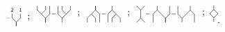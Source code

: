 \documentclass{amsart}
\renewcommand{\1}{\mathbf{1}}
\theoremstyle{definition}
\begin{document}
\begin{equation*}
\begin{tikzpicture}[scale=.15]
\draw node[scale=.8] at (8,2){$\scriptstyle -$};

\draw node[scale=.8] at (9,4){$\scriptstyle 2$};
\draw node[scale=.8] at (11,4){$\scriptstyle 1$};
\draw (9,3)--(9,2)--(10,1)--(10,0);
\draw (11,3)--(11,2)--(10,1)--(10,0);

\node at (13,2){;};
\end{tikzpicture} 
\begin{tikzpicture}[scale=.15]
\node at (4.8,4.2){};
\node at (4.8,-.2){};

\draw (7,4)--(7,3)--(6,2);
\draw (5,4)--(5,3)--(7,1)--(7,0);
\draw (8,4)--(8,2)--(7,1)--(7,0);

\draw node[scale=.8] at (9,2){$\scriptstyle -$};

\draw (10,4)--(10,2)--(11,1)--(11,0);
\draw (13,4)--(13,3)--(11,1);
\draw (11,4)--(11,3)--(12,2);

\node at (15,2){;};
\end{tikzpicture} 
\begin{tikzpicture}[scale=.15]
\node at (4.8,-4.2){};
\node at (4.8,.2){};

\draw (7,-4)--(7,-3)--(6,-2);
\draw (5,-4)--(5,-3)--(7,-1)--(7,0);
\draw (8,-4)--(8,-2)--(7,-1)--(7,0);

\draw node[scale=.8] at (9,-2){$\scriptstyle -$};

\draw (10,-4)--(10,-2)--(11,-1)--(11,0);
\draw (13,-4)--(13,-3)--(11,-1);
\draw (11,-4)--(11,-3)--(12,-2);

\node at (15,-2){;};
\end{tikzpicture}\
\begin{tikzpicture}[scale=.15]
\draw (0,4)--(1,3)--(1,1)--(0,0);
\draw (2,4)--(1,3);
\draw (1,1)--(2,0);

\draw node[scale=.8] at (2.7,2){$\scriptstyle -$};

\draw (5,4)--(5,3)--(4,2)--(4,0);
\draw (5,3)--(7,1)--(7,0);
\draw (8,4)--(8,2)--(7,1)--(7,0);

\draw node[scale=.8] at (9,2){$\scriptstyle -$};

\draw (10,4)--(10,2)--(11,1)--(11,0);
\draw (13,4)--(13,3)--(11,1);
\draw (13,3)--(14,2)--(14,0);

\node at (4.8,4.2){};
\node at (14.3,-.2){};
\end{tikzpicture}
\begin{tikzpicture}[scale=.15]
\node at (-1.5,2){;};
\draw (1,4)--(1,3)--(0,2)--(1,1)--(1,0);
\draw (1,3)--(2,2)--(1,1);

\node at (2.2,4.2){};
\node at(2.2,-.2){.};
\end{tikzpicture}
\end{equation*}	
\end{document}
